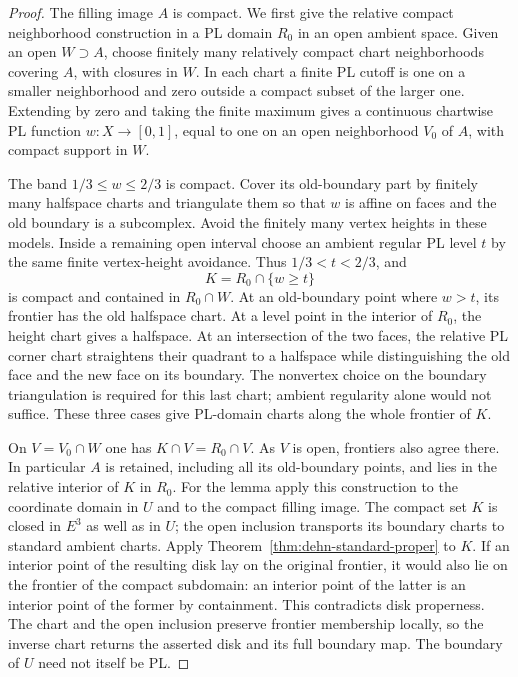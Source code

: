 \begin{proof}
The filling image $A$ is compact.  We first give the relative compact
neighborhood construction in a PL domain $R_0$ in an open ambient
space.  Given an open $W\supset A$, choose finitely many relatively
compact chart neighborhoods covering $A$, with closures in $W$.
In each chart a finite PL cutoff is one on a smaller neighborhood
and zero outside a compact subset of the larger one.  Extending by
zero and taking the finite maximum gives a continuous chartwise PL
function $w:X\to[0,1]$, equal to one on an open neighborhood $V_0$
of $A$, with compact support in $W$.

The band $1/3\leq w\leq2/3$ is compact.  Cover its old-boundary
part by finitely many halfspace charts and triangulate them so that
$w$ is affine on faces and the old boundary is a subcomplex.  Avoid
the finitely many vertex heights in these models.  Inside a remaining
open interval choose an ambient regular PL level $t$ by the same
finite vertex-height avoidance.  Thus $1/3<t<2/3$, and
\[
                        K=R_0\cap\{w\geq t\}
\]
is compact and contained in $R_0\cap W$.  At an old-boundary point
where $w>t$, its frontier has the old halfspace chart.  At a level
point in the interior of $R_0$, the height chart gives a halfspace.
At an intersection of the two faces, the relative PL corner chart
straightens their quadrant to a halfspace while distinguishing the
old face and the new face on its boundary.  The nonvertex choice on
the boundary triangulation is required for this last chart; ambient
regularity alone would not suffice.  These three cases give PL-domain
charts along the whole frontier of $K$.

On $V=V_0\cap W$ one has $K\cap V=R_0\cap V$.  As $V$ is open,
frontiers also agree there.  In particular $A$ is retained, including
all its old-boundary points, and lies in the relative interior of
$K$ in $R_0$.  For the lemma apply this construction to the coordinate
domain in $U$ and to the compact filling image.  The compact set $K$
is closed in $E^3$ as well as in $U$; the open inclusion transports
its boundary charts to standard ambient charts.  Apply
Theorem~\ref{thm:dehn-standard-proper} to $K$.
If an interior point of the resulting disk lay on the original
frontier, it would also lie on the frontier of the compact subdomain:
an interior point of the latter is an interior point of the former
by containment.  This contradicts disk properness.  The chart and
the open inclusion preserve frontier membership locally, so the
inverse chart returns the asserted disk and its full boundary map.
The boundary of $U$ need not itself be PL.
\end{proof}

